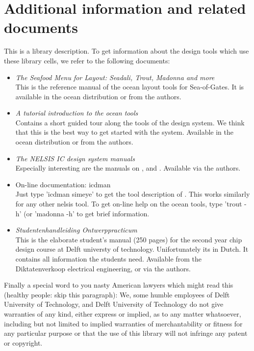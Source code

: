 \section{Additional information and related documents}
This is a library description. To get information about the design tools which
use these library cells, we refer to the following documents:
\begin{itemize}
\item
{\em The Seafood Menu for Layout: Seadali, Trout, Madonna and more}\\
This is the reference manual of the {\sc ocean} layout tools for Sea-of-Gates.
It is available in the ocean distribution or from the authors. 
\item
{\em A tutorial introduction to the {\sc ocean} tools}\\
Contains a short guided tour along the tools of the design system. We
think that this is the best way to get started with the system.
Available in the ocean distribution or from the authors.
\item
{\em The NELSIS IC design system manuals}\\ 
Especially interesting are the manuals on ,  
and . Available via the authors.
\item 
On-line documentation: icdman\\ 
Just type 'icdman simeye' to get the tool
description of .  This works similarly for any other nelsis tool.
To get on-line help on the ocean tools, type 'trout -h' (or 'madonna -h' to
get brief information.
\item
{\em Studentenhandleiding Ontwerppracticum}\\ 
This is the elaborate student's
manual (250 pages) for the second year chip design course at Delft universty of
technology.  Unifortunately its in Dutch. It contains all information the
students need. Available from the Diktatenverkoop electrical engineering, or
via the authors.
\end{itemize}

Finally a special word to you nasty American lawyers which might read this
(healthy people: skip this paragraph): We, some humble employees of Delft
University of Technology, and Delft University of Technology do not give
warranties of any kind, either express or
implied, as to any matter whatsoever, including but not limited to implied
warranties of merchantability or fitness for any particular purpose or that
the use of this library will not infringe any patent or copyright.

